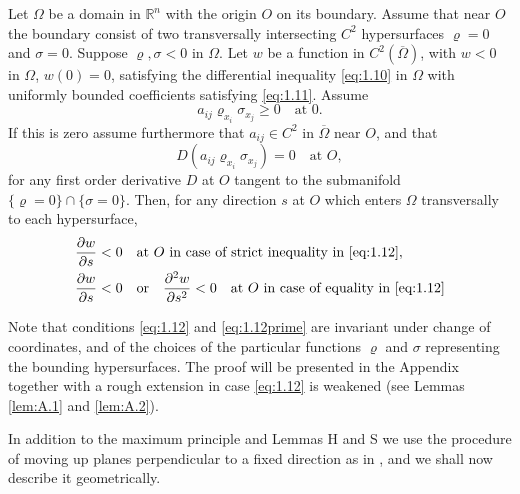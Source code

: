\begin{lemmaS}
  Let $\Omega$ be a domain in $\mathbb{R}^n$ with the origin $O$ on its boundary.
  Assume that near $O$ the boundary consist of two transversally intersecting
  $C^2$ hypersurfaces $\varrho = 0$ and $\sigma = 0$.
  Suppose $\varrho,\sigma<0$ in $\Omega$. Let $w$ be a function in $C^2(\overline{\Omega})$,
  with $w<0$ in $\Omega$, $w(0)=0$, satisfying the differential inequality \eqref{eq:1.10}
  in $\Omega$ with uniformly bounded coefficients satisfying \eqref{eq:1.11}. Assume
  \begin{equation}\label{eq:1.12}
    a_{ij}\varrho_{x_i}\sigma_{x_j} \geq 0\quad \text{at } 0.
  \end{equation}
  If this is zero assume furthermore that $a_{ij}\in C^2$ in $\overline{\Omega}$
  near $O$, and that
  \begin{equation}\label{eq:1.12prime}
    D(a_{ij}\varrho_{x_i}\sigma_{x_j}) = 0 \quad \text{at } O, \tag{$1.12'$}
  \end{equation}
  for any first order derivative $D$ at $O$ tangent to the submanifold
  $\{\varrho=0\}\cap \{\sigma=0\}$.
  Then, for any direction $s$ at $O$ which enters $\Omega$ transversally to each hypersurface,
  \begin{equation}\label{eq:1.13}
    \begin{aligned}
      & \frac{\partial w}{\partial s} < 0 \quad\text{at } O 
        \text{ in case of strict inequality in \eqref{eq:1.12}}, \\
      & \frac{\partial w}{\partial s} < 0\quad \text{or} \quad
        \frac{\partial^2w}{\partial s^2} < 0\quad
        \text{at } O \text{ in case of equality in \eqref{eq:1.12}}
    \end{aligned}
  \end{equation}
\end{lemmaS}

Note that conditions \eqref{eq:1.12} and \eqref{eq:1.12prime} are invariant under
change of coordinates, and of the choices of the particular functions $\varrho$ 
and $\sigma$ representing the bounding hypersurfaces.
The proof will be presented in the Appendix together with a rough extension
in case \eqref{eq:1.12} is weakened (see Lemmas \ref{lem:A.1} and \ref{lem:A.2}).

\medskip

\hspace{1em}In addition to the maximum principle and Lemmas H and S
we use the procedure of moving up planes perpendicular to a fixed direction as in \cite{serrin_symmetry_1971},
and we shall now describe it geometrically.

